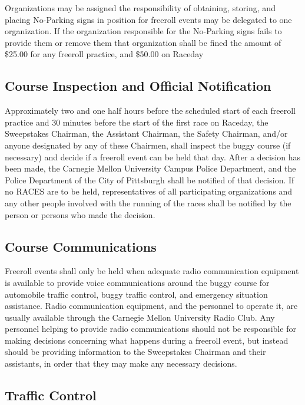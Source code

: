 	Organizations may be assigned the responsibility of obtaining, storing, and placing No-Parking signs in position for freeroll events may be delegated to one organization. If the organization responsible for the No-Parking signs fails to provide them or remove them that organization shall be fined the amount of \$25.00 for any freeroll practice, and \$50.00 on Raceday

	
\subsection{Course Inspection and Official Notification}

	Approximately two and one half hours before the scheduled start of each freeroll practice and 30 minutes before the start of the first race on Raceday, the Sweepstakes Chairman, the Assistant Chairman, the Safety Chairman, and/or anyone designated by any of these Chairmen, shall inspect the buggy course (if necessary) and decide if a freeroll event can be held that day. After a decision has been made, the Carnegie Mellon University Campus Police Department, and the Police Department of the City of Pittsburgh shall be notified of that decision. If no RACES are to be held, representatives of all participating organizations and any other people involved with the running of the races shall be notified by the person or persons who made the decision.


\subsection{Course Communications}

	Freeroll events shall only be held when adequate radio communication equipment is available to provide voice communications around the buggy course for automobile traffic control, buggy traffic control, and emergency situation assistance. Radio communication equipment, and the personnel to operate it, are usually available through the Carnegie Mellon University Radio Club. Any personnel helping to provide radio communications should not be responsible for making decisions concerning what happens during a freeroll event, but instead should be providing information to the Sweepstakes Chairman and their assistants, in order that they may make any necessary decisions.
	
	
\subsection{Traffic Control}

